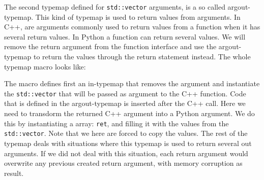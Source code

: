 The second typemap defined for \texttt{std::vector} arguments, is a so called argout-typemap. This kind of typemap is used to return values from arguments. In C++, are arguments commonly used to return values from a function when it has several return values. In Python a function can return several values. We will remove the return argument from the function interface and use the argout-typemap to return the values through the return statement instead. The whole typemap macro looks like:
The macro defines first an in-typemap that removes the argument and instantiate the \texttt{std::vector} that will be passed as argument to the C++ function. Code that is defined in the argout-typemap is inserted after the C++ call. Here we need to transdorm the returned C++ argument into a Python argument. We do this by instantiating a \numpy array: \texttt{ret}, and filling it with the values from the \texttt{std::vector}. Note that we here are forced to copy the values. The rest of the typemap deals with situations where this typemap is used to return several out arguments. If we did not deal with this situation, each return argument would overwrite any previous created return argument, with memory corruption as result.\par

